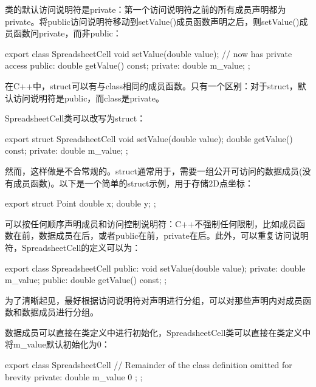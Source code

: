 类的默认访问说明符是private：第一个访问说明符之前的所有成员声明都为private。将public访问说明符移动到setValue()成员函数声明之后，则setValue()成员函数问private，而非public：

\begin{cpp}
export class SpreadsheetCell
{
        void setValue(double value); // now has private access
    public:
        double getValue() const;
    private:
        double m_value;
};
\end{cpp}

在C++中，struct可以有与class相同的成员函数。只有一个区别：对于struct，默认访问说明符是public，而class是private。

SpreadsheetCell类可以改写为struct：

\begin{cpp}
export struct SpreadsheetCell
{
        void setValue(double value);
        double getValue() const;
    private:
        double m_value;
};
\end{cpp}

然而，这样做是不合常规的。struct通常用于，需要一组公开可访问的数据成员(没有成员函数)。以下是一个简单的struct示例，用于存储2D点坐标：

\begin{cpp}
export struct Point
{
    double x;
    double y;
};
\end{cpp}


可以按任何顺序声明成员和访问控制说明符：C++不强制任何限制，比如成员函数在前，数据成员在后，或者public在前，private在后。此外，可以重复访问说明符，SpreadsheetCell的定义可以为：

\begin{cpp}
export class SpreadsheetCell
{
    public:
        void setValue(double value);
    private:
        double m_value;
    public:
        double getValue() const;
};
\end{cpp}

为了清晰起见，最好根据访问说明符对声明进行分组，可以对那些声明内对成员函数和数据成员进行分组。


数据成员可以直接在类定义中进行初始化，SpreadsheetCell类可以直接在类定义中将m\_value默认初始化为0：

\begin{cpp}
export class SpreadsheetCell
{
    // Remainder of the class definition omitted for brevity
    private:
        double m_value { 0 };
};
\end{cpp}

